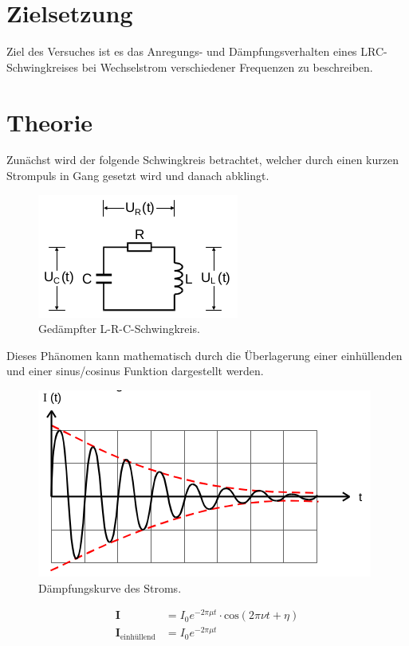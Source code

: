\section{Zielsetzung}
\label{sec:Zielsetzung}

Ziel des Versuches ist es das Anregungs- und Dämpfungsverhalten eines LRC-Schwingkreises
bei Wechselstrom verschiedener Frequenzen zu beschreiben.


\section{Theorie}
\label{sec:Theorie}

Zunächst wird der folgende Schwingkreis betrachtet, welcher durch einen
kurzen Strompuls in Gang gesetzt wird und danach abklingt.

\begin{figure}[H]
  \centering
  \includegraphics{content/images/V354.png}
  \caption{Gedämpfter L-R-C-Schwingkreis.}
  \label{fig:schwingkreis}
\end{figure}

Dieses Phänomen kann mathematisch durch die Überlagerung einer
einhüllenden und einer sinus/cosinus Funktion dargestellt werden.

\begin{figure}[H]
  \centering
  \includegraphics{content/images/dia.png}
  \caption{Dämpfungskurve des Stroms.}
  \label{fig:schwingkreis}
\end{figure}


\begin{align}
  \symbf{I} &= I_0 e^{-2\pi\mu t}
  \cdot\text{cos}\left(2\pi\nu t+\eta\right)\\
  \symbf{I}_\text{einhüllend} &= I_0 e^{-2\pi\mu t}
  \label{eqn:einhuellend}
\end{align}
